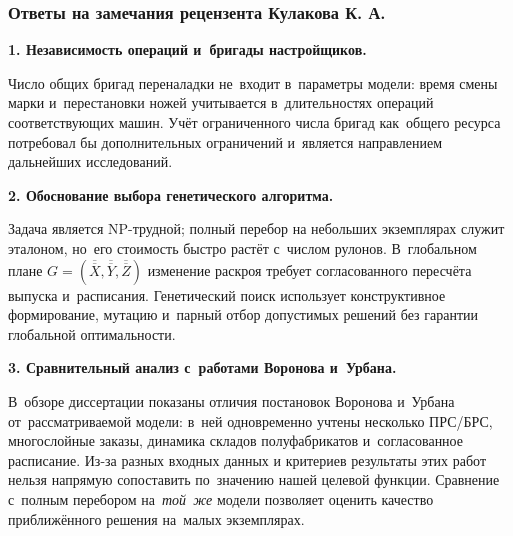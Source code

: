 \begin{frame}
    \frametitle{Ответы на замечания рецензента Кулакова К. А.}
    \scriptsize
    \textbf{1. Независимость операций и~бригады настройщиков.}

    Число общих бригад переналадки не~входит в~параметры модели: время смены марки и~перестановки ножей учитывается в~длительностях операций соответствующих машин.
    Учёт ограниченного числа бригад как~общего ресурса потребовал бы дополнительных ограничений и~является направлением дальнейших исследований.

    \vspace{0.15cm}
    \textbf{2. Обоснование выбора генетического алгоритма.}

    Задача является NP-трудной; полный перебор на небольших экземплярах служит эталоном, но~его стоимость быстро растёт с~числом рулонов.
    В~глобальном плане $G=(\overline{\overline{X}},\overline{\overline{Y}},\overline{\overline{Z}})$ изменение раскроя требует согласованного пересчёта выпуска и~расписания.
    Генетический поиск использует конструктивное формирование, мутацию и~парный отбор допустимых решений без гарантии глобальной оптимальности.

    \vspace{0.15cm}
    \textbf{3. Сравнительный анализ с~работами Воронова и~Урбана.}

    В~обзоре диссертации показаны отличия постановок Воронова и~Урбана от~рассматриваемой модели: в~ней одновременно учтены несколько ПРС/БРС, многослойные заказы, динамика складов полуфабрикатов и~согласованное расписание.
    Из-за разных входных данных и критериев результаты этих работ нельзя напрямую сопоставить по~значению нашей целевой функции.
    Сравнение с~полным перебором на~\emph{той~же} модели позволяет оценить качество приближённого решения на~малых экземплярах.
\end{frame}

